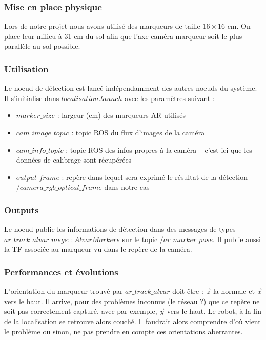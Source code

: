 \documentclass[10pt,a4paper]{article}
\begin{document}
\subsubsection*{Mise en place physique} 
Lors de notre projet nous avons utilisé des marqueurs de taille $16 \times 16$ cm. On place leur milieu à 31 cm du sol afin que l'axe caméra-marqueur soit le plus parallèle au sol possible.

\subsubsection*{Utilisation}
 Le noeud de détection est lancé indépendamment des autres noeuds du système. Il s'initialise dans $localisation.launch$ avec les paramètres suivant : 
\begin{itemize}
\item $marker\_size$ : largeur (cm) des marqueurs AR utilisés
\item $cam\_image\_topic$ : topic ROS du flux d'images de la caméra
\item $cam\_info\_topic$ : topic ROS des infos propres à la caméra -- c'est ici que les données de calibrage sont récupérées
\item $output\_frame$ : repère dans lequel sera exprimé le résultat de la détection -- $/camera\_rgb\_optical\_frame$ dans notre cas
\end{itemize}

\subsubsection*{Outputs}
Le noeud publie les informations de détection dans des messages de types $ar\_track\_alvar\_msgs::AlvarMarkers$ sur le topic $/ar\_marker\_pose$. Il publie aussi la TF associée au marqueur vu dans le repère de la caméra.
	
\subsubsection*{Performances et évolutions}
L'orientation du marqueur trouvé par $ar\_track\_alvar$ doit être : $\vec{z}$ la normale et $\vec{x}$ vers le haut. Il arrive, pour des problèmes inconnus (le réseau ?) que ce repère ne soit pas correctement capturé, avec par exemple, $\vec{y}$ vers le haut. Le robot, à la fin de la localisation se retrouve alors couché. Il faudrait alors comprendre d'où vient le problème ou sinon, ne pas prendre en compte ces orientations aberrantes. 
	
\end{document}

